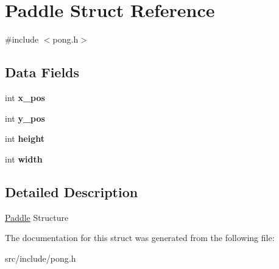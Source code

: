 \hypertarget{struct_paddle}{}\section{Paddle Struct Reference}
\label{struct_paddle}


{\ttfamily \#include $<$pong.\+h$>$}

\subsection*{Data Fields}
\begin{DoxyCompactItemize}
\item 
\hypertarget{struct_paddle_ae4735842d683c9c428bac83efcc74aa4}{}int {\bfseries x\+\_\+pos}\label{struct_paddle_ae4735842d683c9c428bac83efcc74aa4}

\item 
\hypertarget{struct_paddle_a4e05c9830de6100447d13b64ef23647d}{}int {\bfseries y\+\_\+pos}\label{struct_paddle_a4e05c9830de6100447d13b64ef23647d}

\item 
\hypertarget{struct_paddle_afb347bccf9af92576979817916e4c367}{}int {\bfseries height}\label{struct_paddle_afb347bccf9af92576979817916e4c367}

\item 
\hypertarget{struct_paddle_a77fd5f7348c15e783a0254458cbeee50}{}int {\bfseries width}\label{struct_paddle_a77fd5f7348c15e783a0254458cbeee50}

\end{DoxyCompactItemize}


\subsection{Detailed Description}
\hyperlink{struct_paddle}{Paddle} Structure 

The documentation for this struct was generated from the following file\+:\begin{DoxyCompactItemize}
\item 
src/include/pong.\+h\end{DoxyCompactItemize}
